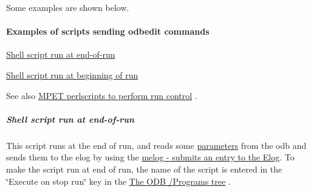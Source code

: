 Some examples are shown below.\hypertarget{RC_odbedit_examples_RC_odbedit_script_examples}{}\paragraph{Examples of scripts sending odbedit commands}\label{RC_odbedit_examples_RC_odbedit_script_examples}

\begin{DoxyItemize}
\item \hyperlink{RC_odbedit_examples_RC_example_script_1}{Shell script run at end-\/of-\/run}
\item \hyperlink{RC_odbedit_examples_RC_example_script_2}{Shell script run at beginning of run}
\end{DoxyItemize}

See also \hyperlink{RC_mhttpd_defining_script_buttons_RC_odb_script_ex2_perlscript}{MPET perlscripts to perform run control} .

\label{RC_odbedit_examples_idx_script_end-of-run}
\hypertarget{RC_odbedit_examples_idx_script_end-of-run}{}
 \hypertarget{RC_odbedit_examples_RC_example_script_1}{}\subparagraph{Shell script run at end-\/of-\/run}\label{RC_odbedit_examples_RC_example_script_1}
This script runs at the end of run, and reads some \hyperlink{structparameters}{parameters} from the odb and sends them to the elog by using the \hyperlink{F_Elog_F_melog_utility}{melog -\/ submits an entry to the Elog}. To make the script run at end of run, the name of the script is entered in the \char`\"{}Execute on stop run\char`\"{} key in the \hyperlink{RC_customize_ODB_RC_ODB_Programs_Tree}{The ODB /Programs tree} .


